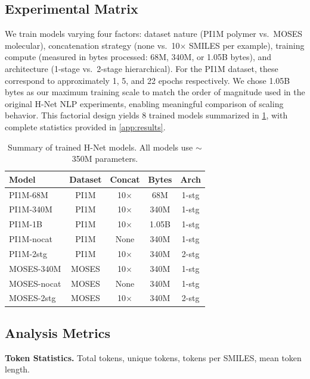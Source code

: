 \documentclass{article}
\newcommand{\hnet}{H-Net}
\begin{document}
\subsection{Experimental Matrix}

We train models varying four factors: dataset nature (PI1M polymer vs.\ MOSES molecular), concatenation strategy (none vs.\ 10$\times$ SMILES per example), training compute (measured in bytes processed: 68M, 340M, or 1.05B bytes), and architecture (1-stage vs.\ 2-stage hierarchical). For the PI1M dataset, these correspond to approximately 1, 5, and 22 epochs respectively. We chose 1.05B bytes as our maximum training scale to match the order of magnitude used in the original \hnet{} NLP experiments, enabling meaningful comparison of scaling behavior. This factorial design yields 8 trained models summarized in \cref{tab:models}, with complete statistics provided in \cref{app:results}.
\begin{table}[t]
\caption{Summary of trained \hnet{} models. All models use $\sim$350M parameters.}
\label{tab:models}
\vskip 0.1in
\begin{center}
\begin{small}
\begin{tabular}{lcccc}
\toprule
Model & Dataset & Concat & Bytes & Arch \\
\midrule
PI1M-68M & PI1M & 10$\times$ & 68M & 1-stg \\
PI1M-340M & PI1M & 10$\times$ & 340M & 1-stg \\
PI1M-1B & PI1M & 10$\times$ & 1.05B & 1-stg \\
PI1M-nocat & PI1M & None & 340M & 1-stg \\
PI1M-2stg & PI1M & 10$\times$ & 340M & 2-stg \\
MOSES-340M & MOSES & 10$\times$ & 340M & 1-stg \\
MOSES-nocat & MOSES & None & 340M & 1-stg \\
MOSES-2stg & MOSES & 10$\times$ & 340M & 2-stg \\
\bottomrule
\end{tabular}
\end{small}
\end{center}
\vskip -0.1in
\end{table}

\subsection{Analysis Metrics}

\textbf{Token Statistics.} Total tokens, unique tokens, tokens per SMILES, mean token length.
\end{document}
